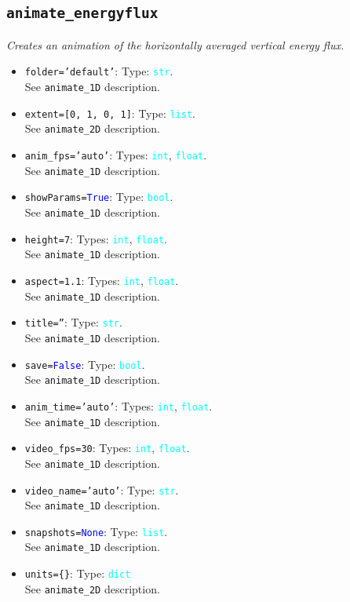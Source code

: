 \documentclass{article}
\newcommand{\ttt}[1]{\texttt{#1}}
\newcommand{\ptype}[1]{\texttt{\textcolor{cyan}{#1}}}
\newcommand{\cbl}[1]{\textcolor{blue}{#1}}
\newcommand{\cro}[1]{\textcolor{RedOrange}{#1}}
\newcommand{\cyo}[1]{\textcolor{YellowOrange}{#1}}
\begin{document}
\subsection{\ttt{animate\_energyflux}}
\label{sec:animen}
\textit{Creates an animation of the horizontally averaged vertical energy flux.}
\begin{itemize}
	\item \ttt{\cro{folder}=\cyo{'default'}}: Type: \ptype{str}.\\See \ttt{animate\_1D} description.
	\item \ttt{\cro{extent}=[0, 1, 0, 1]}: Type: \ptype{list}.\\See \ttt{animate\_2D} description.
	\item \ttt{\cro{anim\_fps}=\cyo{'auto'}}: Types: \ptype{int}, \ptype{float}.\\See \ttt{animate\_1D} description.
	\item \ttt{\cro{showParams}=\cbl{True}}: Type: \ptype{bool}.\\See \ttt{animate\_1D} description.
	\item \ttt{\cro{height}=7}: Types: \ptype{int}, \ptype{float}.\\See \ttt{animate\_1D} description.
	\item \ttt{\cro{aspect}=1.1}: Types: \ptype{int}, \ptype{float}.\\See \ttt{animate\_1D} description.
	\item \ttt{\cro{title}=\cyo{''}}: Type: \ptype{str}.\\See \ttt{animate\_1D} description.
	\item \ttt{\cro{save}=\cbl{False}}: Type: \ptype{bool}.\\See \ttt{animate\_1D} description.
	\item \ttt{\cro{anim\_time}=\cyo{'auto'}}: Types: \ptype{int}, \ptype{float}.\\See \ttt{animate\_1D} description.
	\item \ttt{\cro{video\_fps}=30}: Types: \ptype{int}, \ptype{float}.\\See \ttt{animate\_1D} description.
	\item \ttt{\cro{video\_name}=\cyo{'auto'}}: Type: \ptype{str}.\\See \ttt{animate\_1D} description.
	\item \ttt{\cro{snapshots}=\cbl{None}}: Type: \ptype{list}.\\See \ttt{animate\_1D} description.
	\item \ttt{\cro{units}=\{\}}: Type: \ptype{dict}\\See \ttt{animate\_2D} description.
\end{itemize}
\end{document}
